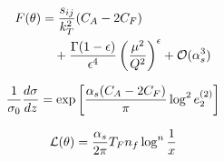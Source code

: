\begin{align}
  F(\theta) &= \frac{s_{ij}}{k_T^2} (C_A - 2C_F) \nonumber \\
  &\quad + \frac{\Gamma(1-\epsilon)}{\epsilon^{4}} \left(\frac{\mu^2}{Q^2}\right)^{\epsilon} + \mathcal{O}(\alpha_s^3) \label{eq:5}
\end{align}

\begin{equation}
  \frac{1}{\sigma_0} \frac{d\sigma}{dz} = \exp\left[\frac{\alpha_s (C_A - 2C_F)}{\pi} \log^2 e_2^{(2)}\right]
  \label{eq:7}
\end{equation}

\begin{equation}
  \mathcal{L}(\theta) = \frac{\alpha_s}{2\pi} T_F n_f \log^{n} \frac{1}{x}
  \label{eq:8}
\end{equation}


